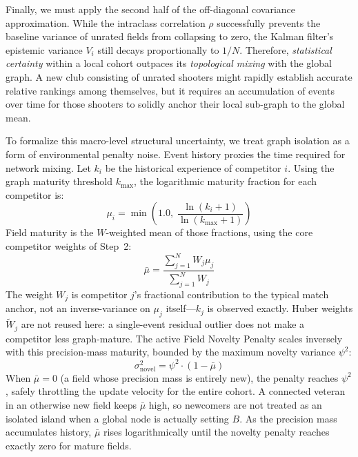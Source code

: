 \documentclass[12pt]{article}
\begin{document}
	Finally, we must apply the second half of the off-diagonal covariance approximation. While the intraclass correlation $\rho$ successfully prevents the baseline variance of unrated fields from collapsing to zero, the Kalman filter's epistemic variance $V_i$ still decays proportionally to $1/N$. Therefore, \textit{statistical certainty} within a local cohort outpaces its \textit{topological mixing} with the global graph. A new club consisting of unrated shooters might rapidly establish accurate relative rankings among themselves, but it requires an accumulation of events over time for those shooters to solidly anchor their local sub-graph to the global mean.

	To formalize this macro-level structural uncertainty, we treat graph isolation as a form of environmental penalty noise. Event history proxies the time required for network mixing. Let $k_i$ be the historical experience of competitor $i$. Using the graph maturity threshold $k_{\mathrm{max}}$, the logarithmic maturity fraction for each competitor is:
	\begin{equation}
		\mu_i = \min\!\left(1.0,\; \frac{\ln(k_i + 1)}{\ln(k_{\mathrm{max}} + 1)}\right)
	\end{equation}
	Field maturity is the $W$-weighted mean of those fractions, using the core competitor weights of Step~2:
	\begin{equation}
		\bar{\mu} = \frac{\sum_{j=1}^N W_j \mu_j}{\sum_{j=1}^N W_j}
	\end{equation}
	The weight $W_j$ is competitor $j$'s fractional contribution to the typical match anchor, not an inverse-variance on $\mu_j$ itself---$k_j$ is observed exactly. Huber weights $\tilde{W}_j$ are not reused here: a single-event residual outlier does not make a competitor less graph-mature. The active Field Novelty Penalty scales inversely with this precision-mass maturity, bounded by the maximum novelty variance $\psi^2$:
	\begin{equation}
		\sigma_{\mathrm{novel}}^2 = \psi^2 \cdot (1 - \bar{\mu})
	\end{equation}
	When $\bar{\mu} = 0$ (a field whose precision mass is entirely new), the penalty reaches $\psi^2$, safely throttling the update velocity for the entire cohort. A connected veteran in an otherwise new field keeps $\bar{\mu}$ high, so newcomers are not treated as an isolated island when a global node is actually setting $B$. As the precision mass accumulates history, $\bar{\mu}$ rises logarithmically until the novelty penalty reaches exactly zero for mature fields.
\end{document}

